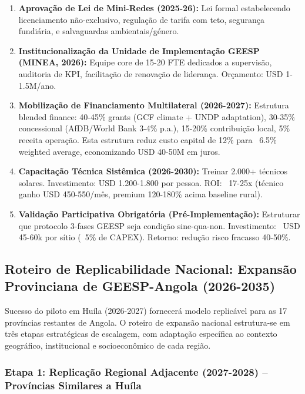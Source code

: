 \documentclass[12pt, a4paper]{article}
\begin{document}
\begin{enumerate}
\item \textbf{Aprovação de Lei de Mini-Redes (2025-26):} Lei formal estabelecendo licenciamento não-exclusivo, regulação de tarifa com teto, segurança fundiária, e salvaguardas ambientais/género.

\item \textbf{Institucionalização da Unidade de Implementação GEESP (MINEA, 2026):} Equipe core de 15-20 FTE dedicados a supervisão, auditoria de KPI, facilitação de renovação de liderança. Orçamento: USD 1-1.5M/ano.

\item \textbf{Mobilização de Financiamento Multilateral (2026-2027):} Estrutura blended finance: 40-45\% grants (GCF climate + UNDP adaptation), 30-35\% concessional (AfDB/World Bank 3-4\% p.a.), 15-20\% contribuição local, 5\% receita operação. Esta estrutura reduz custo capital de 12\% para ~6.5\% weighted average, economizando USD 40-50M em juros.

\item \textbf{Capacitação Técnica Sistêmica (2026-2030):} Treinar 2.000+ técnicos solares. Investimento: USD 1.200-1.800 por pessoa. ROI: ~17-25x (técnico ganho USD 450-550/mês, premium 120-180\% acima baseline rural).

\item \textbf{Validação Participativa Obrigatória (Pré-Implementação):} Estruturar que protocolo 3-fases GEESP seja condição sine-qua-non. Investimento: ~USD 45-60k por sítio (~5\% de CAPEX). Retorno: redução risco fracasso 40-50\%.
\end{enumerate}

\subsection{Roteiro de Replicabilidade Nacional: Expansão Provinciana de GEESP-Angola (2026-2035)}

Sucesso do piloto em Huíla (2026-2027) fornecerá modelo replicável para as 17 províncias restantes de Angola. O roteiro de expansão nacional estrutura-se em três etapas estratégicas de escalagem, com adaptação específica ao contexto geográfico, institucional e socioeconômico de cada região.

\subsubsection{Etapa 1: Replicação Regional Adjacente (2027-2028) -- Províncias Similares a Huíla}
\end{document}
